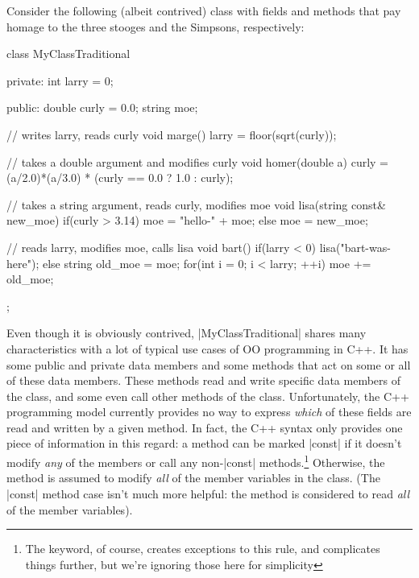 Consider the following (albeit contrived) class with fields and methods that pay
homage to the three stooges and the Simpsons, respectively:
\begin{CppCodeNumb}
class MyClassTraditional {
  private:
    int larry = 0;
    
  public:
    double curly = 0.0;
    string moe;

    // writes larry, reads curly
    void marge() {
      larry = floor(sqrt(curly));
    }

    // takes a double argument and modifies curly
    void homer(double a) {
      curly = (a/2.0)*(a/3.0)
        * (curly == 0.0 ? 1.0 : curly);
    }

    // takes a string argument, reads curly, modifies moe
    void lisa(string const& new_moe) {
      if(curly > 3.14) moe = "hello-" + moe;
      else moe = new_moe;
    }

    // reads larry, modifies moe, calls lisa
    void bart() {
      if(larry < 0) lisa("bart-was-here");
      else {
        string old_moe = moe;
        for(int i = 0; i < larry; ++i) moe += old_moe;
      }
    }

};
\end{CppCodeNumb}
Even though it is obviously contrived, |MyClassTraditional| shares many
characteristics with a lot of typical use cases of OO programming in C++.  It
has some public and private data members and some methods that act on some or
all of these data members.  These methods read and write specific data members
of the class, and some even call other methods of the class.  Unfortunately, the
C++ programming model currently provides no way to express {\it which} of these
fields are read and written by a given method.  In fact, the C++ syntax only
provides one piece of information in this regard:  a method can be marked
|const| if it doesn't modify {\it any} of the members or call any non-|const|
methods.\footnote{The  keyword, of course, creates
exceptions to this rule, and  complicates things further,
but we're ignoring those here for simplicity}  Otherwise, the method is assumed
to modify {\it all} of the member variables in the class.  (The |const| method
case isn't much more helpful: the method is considered to read {\it all} of the
member variables).  

